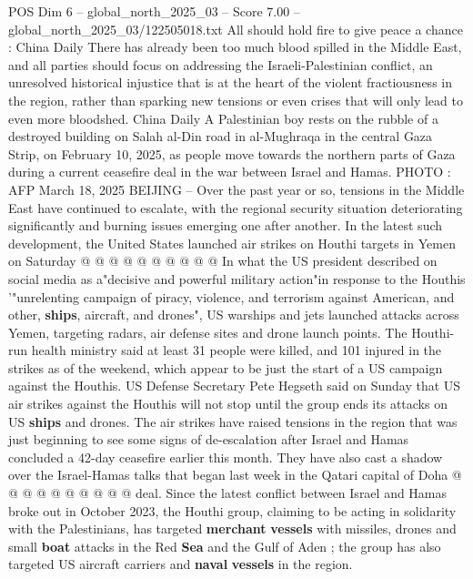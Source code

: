 \begin{textsample}{POS Dim 6 – global\_north\_2025\_03 – Score 7.00 – global\_north\_2025\_03/122505018.txt}  \label{ex:f6_pos_271}
All should hold fire to give peace a chance : China Daily There has already been too much blood spilled in the Middle East, and all parties should focus on addressing the Israeli-Palestinian conflict, an unresolved historical injustice that is at the heart of the violent fractiousness in the region, rather than sparking new tensions or even crises that will only lead to even more bloodshed.
China Daily A Palestinian boy rests on the rubble of a destroyed building on Salah al-Din road in al-Mughraqa in the central Gaza Strip, on February 10, 2025, as people move towards the northern parts of Gaza during a current ceasefire deal in the war between Israel and Hamas.
PHOTO : AFP March 18, 2025 BEIJING -- Over the past year or so, tensions in the Middle East have continued to escalate, with the regional security situation deteriorating significantly and burning issues emerging one after another.
In the latest such development, the United States launched air strikes on Houthi targets in Yemen on Saturday @ @ @ @ @ @ @ @ @ @ In what the US president described on social media as a"decisive and powerful military action"in response to the Houthis '"unrelenting campaign of piracy, violence, and terrorism against American, and other, \textbf{ships}, aircraft, and drones", US warships and jets launched attacks across Yemen, targeting radars, air defense sites and drone launch points.
The Houthi-run health ministry said at least 31 people were killed, and 101 injured in the strikes as of the weekend, which appear to be just the start of a US campaign against the Houthis.
US Defense Secretary Pete Hegseth said on Sunday that US air strikes against the Houthis will not stop until the group ends its attacks on US \textbf{ships} and drones.
The air strikes have raised tensions in the region that was just beginning to see some signs of de-escalation after Israel and Hamas concluded a 42-day ceasefire earlier this month.
They have also cast a shadow over the Israel-Hamas talks that began last week in the Qatari capital of Doha @ @ @ @ @ @ @ @ @ @ deal.
Since the latest conflict between Israel and Hamas broke out in October 2023, the Houthi group, claiming to be acting in solidarity with the Palestinians, has targeted \textbf{merchant} \textbf{vessels} with missiles, drones and small \textbf{boat} attacks in the Red \textbf{Sea} and the Gulf of Aden ; the group has also targeted US aircraft carriers and \textbf{naval} \textbf{vessels} in the region.

\end{textsample}
